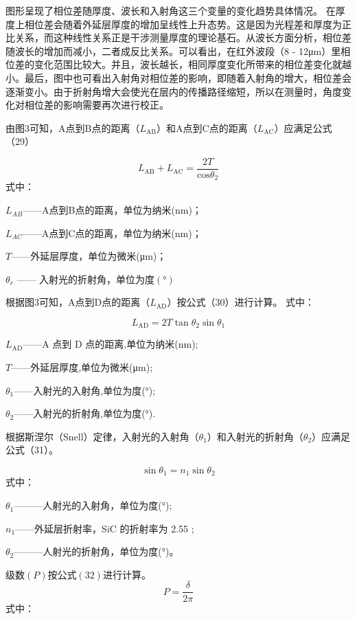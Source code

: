 \documentclass[withoutpreface,bwprint]{cumcmthesis}
\begin{document}
图形呈现了相位差随厚度、波长和入射角这三个变量的变化趋势具体情况。
在厚度上相位差会随着外延层厚度的增加呈线性上升态势。这是因为光程差和厚度为正比关系，而这种线性关系正是干涉测量厚度的理论基石。从波长方面分析，相位差随波长的增加而减小，二者成反比关系。可以看出，在红外波段（8 - 12μm）里相位差的变化范围比较大。并且，波长越长，相同厚度变化所带来的相位差变化就越小。最后，图中也可看出入射角对相位差的影响，即随着入射角的增大，相位差会逐渐变小。由于折射角增大会使光在层内的传播路径缩短，所以在测量时，角度变化对相位差的影响需要再次进行校正。


由图3可知，A点到B点的距离（$L_{\mathrm{AB}}$）和A点到C点的距离（$L_{\mathrm{AC}}$）应满足公式（29）

\begin{equation}L_{\mathrm{AB}}+L_{\mathrm{AC}}=\frac{2T}{\mathrm{cos}\theta_2}\end{equation}
式中：

$L_{AB}$——A点到B点的距离，单位为纳米(nm)；

$L_{AC}$——A点到C点的距离，单位为纳米(nm)；

$T$——外延层厚度，单位为微米(μm)；

$\theta_r \text{ —— 入射光的折射角，单位为度} (°)$

根据图3可知，A点到D点的距离（$L_{\mathrm{AD}}$）按公式（30）进行计算。
式中：

\begin{equation}
    L_{\mathrm{AD}}=2T\tan\theta_{2}\sin\theta_{1}
\end{equation}

$L_{\mathrm{AD}}$——A 点到 D 点的距离,单位为纳米(nm);

$T$——外延层厚度,单位为微米(μm);

$\theta_{1}$——入射光的入射角,单位为度(°);

$\theta_{2}$——入射光的折射角,单位为度(°).

根据斯涅尔（Snell）定律，入射光的入射角（$\theta_{1}$）和入射光的折射角（$\theta_{2}$）应满足公式（31）。

\begin{equation}\sin\theta_1=n_1\sin\theta_2\end{equation}
式中：

$\theta_1$———人射光的入射角，单位为度(°);

$n_1$——外延层折射率，SiC 的折射率为 2.55 ;

$\theta_2$———人射光的折射角，单位为度(°)。

$\text{级数}(P)\text{按公式}(32)\text{进行计算。}$
\begin{equation}
    P=\frac{\delta}{2\pi}
\end{equation}
式中：
\end{document}
